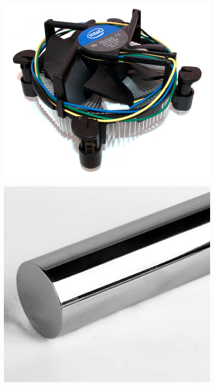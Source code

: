 \begin{figure}[H]
    \centering
    \includegraphics[scale=0.20]{figuras/projeto/controle/cooler.png}
    \label{fig:cooler}
\end{figure}


\begin{figure}[H]
    \centering
    \includegraphics[scale=0.30]{figuras/projeto/controle/haste.png}
    \label{fig:haste_inox}
\end{figure}

